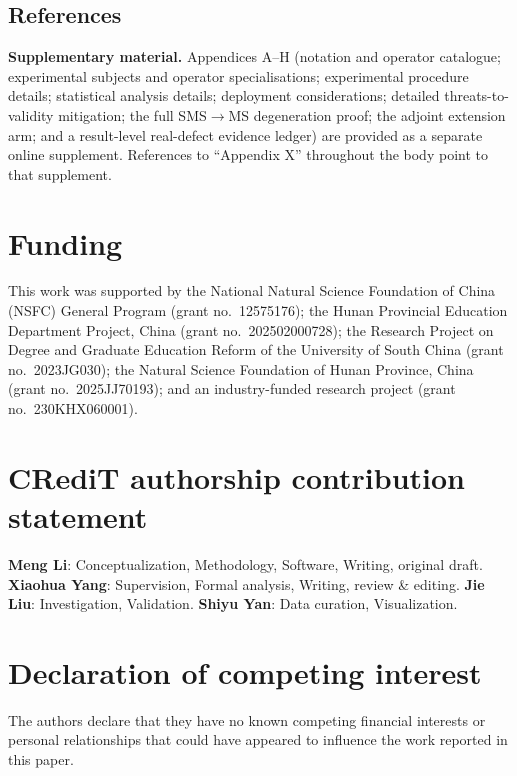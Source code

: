 \documentclass[review,12pt,authoryear]{elsarticle}
\begin{document}

\subsection{References}\label{references}




\clearpage

\textbf{Supplementary material.} Appendices A--H (notation and operator
catalogue; experimental subjects and operator specialisations; experimental
procedure details; statistical analysis details; deployment considerations;
detailed threats-to-validity mitigation; the full SMS$\to$MS degeneration
proof; the adjoint extension arm; and a result-level real-defect evidence
ledger) are provided as a separate online
supplement. References to ``Appendix X'' throughout the body point to that
supplement.

\section*{Funding}

This work was supported by the National Natural Science Foundation of China (NSFC) General Program (grant no.\ 12575176); the Hunan Provincial Education Department Project, China (grant no.\ 202502000728); the Research Project on Degree and Graduate Education Reform of the University of South China (grant no.\ 2023JG030); the Natural Science Foundation of Hunan Province, China (grant no.\ 2025JJ70193); and an industry-funded research project (grant no.\ 230KHX060001).

\section*{CRediT authorship contribution statement}

\textbf{Meng Li}: Conceptualization, Methodology, Software, Writing, original draft. \textbf{Xiaohua Yang}: Supervision, Formal analysis, Writing, review \& editing. \textbf{Jie Liu}: Investigation, Validation. \textbf{Shiyu Yan}: Data curation, Visualization.

\section*{Declaration of competing interest}

The authors declare that they have no known competing financial interests or personal relationships that could have appeared to influence the work reported in this paper.
\end{document}
